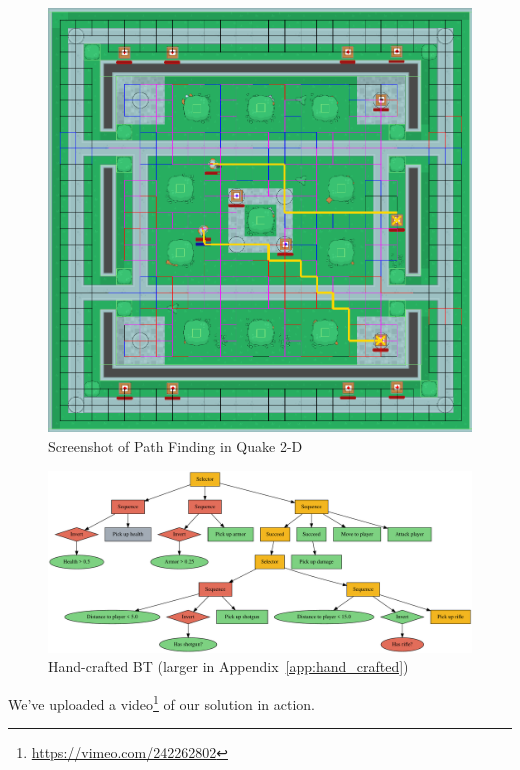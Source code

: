 \documentclass[a4paper, twocolumn]{article}
\begin{document}
        \begin{figure}[H]
            \centering
            \includegraphics[width=\linewidth]{share/path_finding_screenshot.png}
            \caption{Screenshot of Path Finding in Quake 2-D}
            \label{fig:path_finding_screenshot}
        \end{figure}

        \begin{figure}[H]
            \centering
            \includegraphics[width=\linewidth]{share/hand_crafted_behaviour_tree.pdf}
            \caption{Hand-crafted BT (larger in Appendix~\ref{app:hand_crafted})}
            \label{fig:hand_crafted_behaviour_tree}
        \end{figure}

        We've uploaded a video\footnote{\url{https://vimeo.com/242262802}} of our solution in action.
\end{document}
